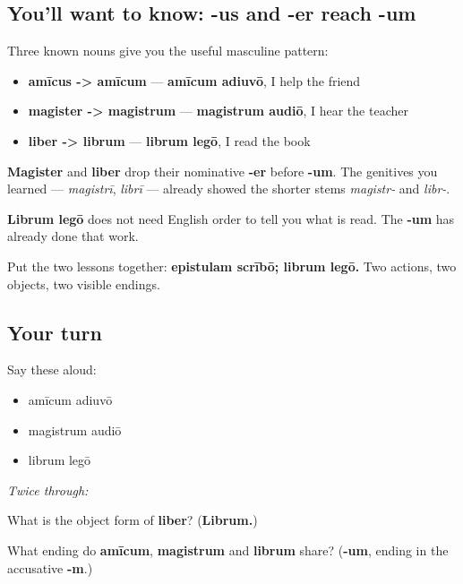 \subsection*{You'll want to know: -us and -er reach -um}
Three known nouns give you the useful masculine pattern:

\begin{itemize}
\raggedright
  \item \textbf{amīcus -> amīcum} — \textbf{amīcum adiuvō}, I help the friend
  \item \textbf{magister -> magistrum} — \textbf{magistrum audiō}, I hear the teacher
  \item \textbf{liber -> librum} — \textbf{librum legō}, I read the book
\end{itemize}

\textbf{Magister} and \textbf{liber} drop their nominative \textbf{-er} before \textbf{-um}. The genitives you learned — \emph{magistrī}, \emph{librī} — already showed the shorter stems \emph{magistr-} and \emph{libr-}.

\begin{grammarlens}[title={Grammar Lens: the ending frees the order}]
\textbf{Librum legō} does not need English order to tell you what is read. The \textbf{-um} has already done that work.

Put the two lessons together: \textbf{epistulam scrībō; librum legō.} Two actions, two objects, two visible endings.
\end{grammarlens}

\subsection*{Your turn}
Say these aloud:

\begin{itemize}
\raggedright
  \item amīcum adiuvō
  \item magistrum audiō
  \item librum legō
\end{itemize}

\emph{Twice through:}

\begin{tcolorbox}[breakable,colback=teal!4,colframe=teal!35!black,title={Before you move on}]
What is the object form of \textbf{liber}? (\textbf{Librum.})

What ending do \textbf{amīcum}, \textbf{magistrum} and \textbf{librum} share? (\textbf{-um}, ending in the accusative \textbf{-m}.)
\end{tcolorbox}
